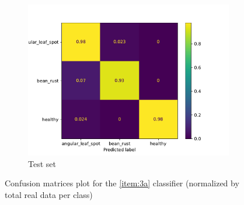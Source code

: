 \documentclass[10pt, a4paper]{article}
\begin{document}
\begin{figure}[htpb]
\begin{subfigure}[b]{0.32\textwidth}
      \includegraphics[width=\textwidth]{images/cm_test.pdf}
      \caption{Test set}
      \label{fig:cm_test}
  \end{subfigure}
  \caption{Confusion matrices plot for the \ref{item:3a} classifier (normalized by total real data per class)}
  \label{fig:conf_matrix}

\end{figure}





\end{document}
